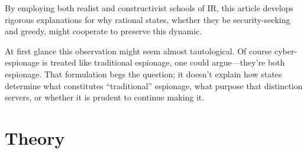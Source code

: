 \documentclass[14pt]{extarticle}
\begin{document}
By employing both realist and constructivist schools of IR, this article develops rigorous explanations for why rational states, whether they be security-seeking and greedy, might cooperate to preserve this dynamic.

At first glance this observation might seem almost tautological. Of course cyber-espionage is treated like traditional espionage, one could argue---they're both espionage. That formulation begs the question; it doesn't explain how states determine what constitutes \enquote{traditional} espionage, what purpose that distinction servers, or whether it is prudent to continue making it.

\section{Theory}








\end{document}
